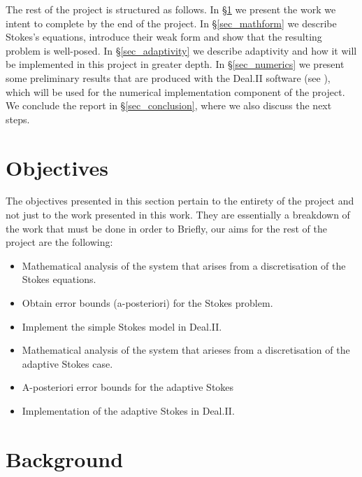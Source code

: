 \documentclass[12pt,a4paper]{article}
\theoremstyle{definition}
\begin{document}
The rest of the project is structured as follows.  In \S \ref{sec_obj} we present the work we intent to complete by the end of the project.  In \S \ref{sec_mathform} we describe Stokes's equations, introduce their weak form and show that the resulting problem is well-posed.  In \S \ref{sec_adaptivity} we  describe adaptivity and how it will be implemented in this project in greater depth.  In \S \ref{sec_numerics} we present some preliminary results that are produced with the Deal.II software (see \cite{BangerthHartmannKanschat2007}), which  will be used for the numerical implementation component of the project.  We conclude the report in \S \ref{sec_conclusion}, where we also discuss the next steps.

\section{Objectives}\label{sec_obj}
The objectives presented in this section pertain to the entirety of the project and not just to the work presented in this work.  They are essentially a breakdown of the work that must be done in order to  Briefly, our aims for the rest of the project are the following:
\begin{itemize}
\item Mathematical analysis of the system that arises from a discretisation of the Stokes equations.
\item Obtain error bounds (a-posteriori) for the Stokes problem.
\item Implement the simple Stokes model in Deal.II.
\item Mathematical analysis of the system that arieses from a discretisation of the adaptive Stokes case.
\item A-posteriori error bounds for the adaptive Stokes
\item Implementation of the adaptive Stokes in Deal.II.
\end{itemize}


\section{Background}\label{literature_review}
\end{document}
